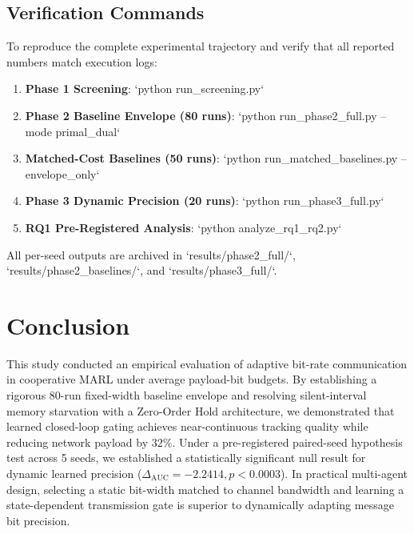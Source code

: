 \documentclass[10pt,twocolumn,letterpaper]{article}
\begin{document}
\subsection{Verification Commands}
To reproduce the complete experimental trajectory and verify that all reported numbers match execution logs:
\begin{enumerate}
    \item \textbf{Phase 1 Screening}: `python run_screening.py`
    \item \textbf{Phase 2 Baseline Envelope (80 runs)}: `python run_phase2_full.py --mode primal_dual`
    \item \textbf{Matched-Cost Baselines (50 runs)}: `python run_matched_baselines.py --envelope_only`
    \item \textbf{Phase 3 Dynamic Precision (20 runs)}: `python run_phase3_full.py`
    \item \textbf{RQ1 Pre-Registered Analysis}: `python analyze_rq1_rq2.py`
\end{enumerate}
All per-seed outputs are archived in `results/phase2_full/`, `results/phase2_baselines/`, and `results/phase3_full/`.

\section{Conclusion}
This study conducted an empirical evaluation of adaptive bit-rate communication in cooperative MARL under average payload-bit budgets. By establishing a rigorous 80-run fixed-width baseline envelope and resolving silent-interval memory starvation with a Zero-Order Hold architecture, we demonstrated that learned closed-loop gating achieves near-continuous tracking quality while reducing network payload by $32\%$. Under a pre-registered paired-seed hypothesis test across 5 seeds, we established a statistically significant null result for dynamic learned precision ($\Delta_{\mathrm{AUC}} = -2.2414, p < 0.0003$). In practical multi-agent design, selecting a static bit-width matched to channel bandwidth and learning a state-dependent transmission gate is superior to dynamically adapting message bit precision.
\end{document}
